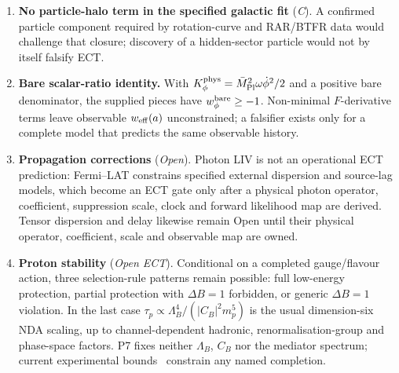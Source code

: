 \documentclass[11pt,a4paper]{article}
\begin{document}
\begin{enumerate}
\item \textbf{No particle-halo term in the specified galactic fit} (\emph{C}). A confirmed particle component required by rotation-curve and RAR/BTFR data would challenge that closure; discovery of a hidden-sector particle would not by itself falsify ECT.

\item \textbf{Bare scalar-ratio identity.} With $K_\phi^{\rm phys}=\bar M_{\rm Pl}^2\omega\dot\phi^2/2$ and a positive bare denominator, the supplied pieces have $w_\phi^{\rm bare}\ge-1$.  Non-minimal $F$-derivative terms leave observable $w_{\rm eff}(a)$ unconstrained; a falsifier exists only for a complete model that predicts the same observable history.

\item \textbf{Propagation corrections} (\emph{Open}).  Photon LIV is not an
operational ECT prediction: Fermi--LAT constrains specified external
dispersion and source-lag models, which become an ECT gate only after a
physical photon operator, coefficient, suppression scale, clock and forward
likelihood map are derived.  Tensor dispersion and delay likewise remain Open
until their physical operator, coefficient, scale and observable map are
owned.

\item \textbf{Proton stability} (\emph{Open ECT}).  Conditional on a completed
gauge/flavour action, three selection-rule patterns remain possible: full
low-energy protection, partial protection with $\Delta B=1$ forbidden, or
generic $\Delta B=1$ violation.  In the last case
$\tau_p\propto\Lambda_B^4/(|C_B|^2m_p^5)$ is the usual dimension-six NDA
scaling, up to channel-dependent hadronic, renormalisation-group and
phase-space factors.  P7 fixes
neither $\Lambda_B$, $C_B$ nor the mediator spectrum; current experimental
bounds~\cite{SuperK2020} constrain any named completion.
\end{enumerate}
\end{document}

